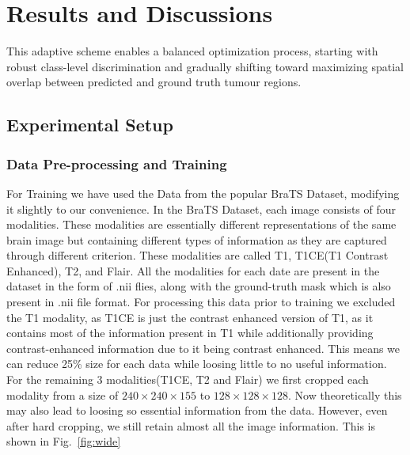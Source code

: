 
\section{Results and Discussions}

This adaptive scheme enables a balanced optimization process, starting with robust class-level discrimination and gradually shifting toward maximizing spatial overlap between predicted and ground truth tumour regions.

\subsection{Experimental Setup}

\subsubsection{Data Pre-processing and Training}

For Training we have used the Data from the popular BraTS Dataset, modifying it slightly to our convenience. In the BraTS Dataset, each image consists of four modalities. These modalities are essentially different representations of the same brain image but containing different types of information as they are captured through different criterion. These modalities are called T1, T1CE(T1 Contrast Enhanced), T2, and Flair. All the modalities for each date are present in the dataset in the form of .nii flies, along with the ground-truth mask which is also present in .nii file format. For processing this data prior to training we excluded the T1 modality, as T1CE is just the contrast enhanced version of T1, as it contains most of the information present in T1 while additionally providing contrast-enhanced information due to it being contrast enhanced. This means we can reduce 25\% size for each data while loosing little to no useful information. For the remaining 3 modalities(T1CE, T2 and Flair) we first cropped each modality from a size of $240\times240\times155$ to $128\times128\times128$. Now theoretically this may also lead to loosing so essential information from the data. However, even after hard cropping, we still retain almost all the image information. This is shown in Fig.~\ref{fig:wide}

